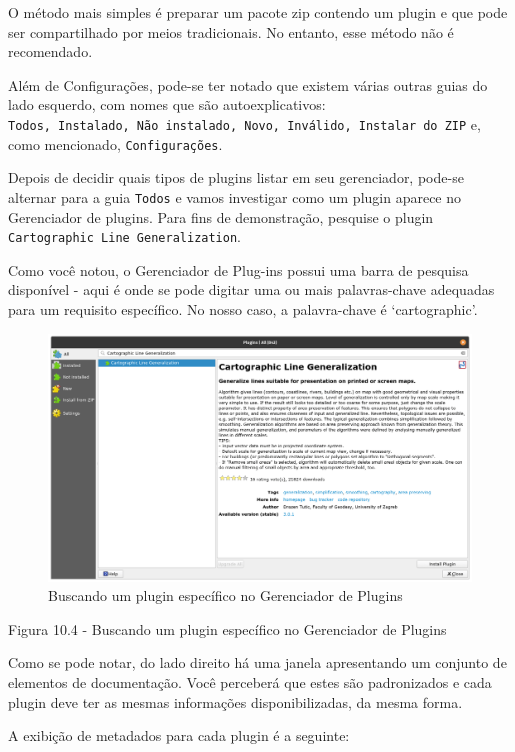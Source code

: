 \documentclass[
]{krantz}
\begin{document}
O método mais simples é preparar um pacote zip contendo um plugin e que pode ser compartilhado por meios tradicionais. No entanto, esse método não é recomendado.

Além de Configurações, pode-se ter notado que existem várias outras guias do lado esquerdo, com nomes que são autoexplicativos: \texttt{Todos,\ Instalado,\ Não\ instalado,\ Novo,\ Inválido,\ Instalar\ do\ ZIP} e, como mencionado, \texttt{Configurações}.

Depois de decidir quais tipos de plugins listar em seu gerenciador, pode-se alternar para a guia \texttt{Todos} e vamos investigar como um plugin aparece no Gerenciador de plugins. Para fins de demonstração, pesquise o plugin \texttt{Cartographic\ Line\ Generalization}.

Como você notou, o Gerenciador de Plug-ins possui uma barra de pesquisa disponível - aqui é onde se pode digitar uma ou mais palavras-chave adequadas para um requisito específico. No nosso caso, a palavra-chave é `cartographic'.

\begin{figure}
\centering
\includegraphics{media/modulo10/fig104.png}
\caption{Buscando um plugin específico no Gerenciador de Plugins}
\end{figure}

Figura 10.4 - Buscando um plugin específico no Gerenciador de Plugins

Como se pode notar, do lado direito há uma janela apresentando um conjunto de elementos de documentação. Você perceberá que estes são padronizados e cada plugin deve ter as mesmas informações disponibilizadas, da mesma forma.

A exibição de metadados para cada plugin é a seguinte:
\end{document}
